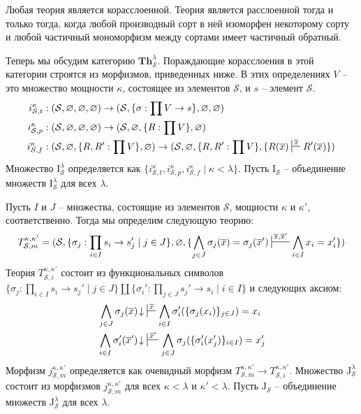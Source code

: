\documentclass[reqno]{amsart}
\theoremstyle{definition}
\theoremstyle{remark}
\newcommand{\bcat}[1]{\mathbf{#1}}
\newcommand{\Th}{\bcat{Th}}
\newcommand{\I}{\mathrm{I}}
\newcommand{\J}{\mathrm{J}}
\begin{document}
\begin{remark}
Любая теория является корасслоенной.
Теория является расслоенной тогда и только тогда, когда любой производный сорт в ней изоморфен некоторому сорту и любой частичный мономорфизм между сортами имеет частичный обратный.
\end{remark}

Теперь мы обсудим категорию $\Th^\lambda_\mathcal{S}$.
Пораждающие корасслоения в этой категории строятся из морфизмов, приведенных ниже.
В этих определениях $V$ -- это множество мощности $\kappa$, состоящее из элементов $\mathcal{S}$, и $s$ -- элемент $\mathcal{S}$.
\begin{align*}
i_{\mathcal{S},t}^\kappa & : (\mathcal{S}, \varnothing, \varnothing, \varnothing) \to (\mathcal{S}, \{ \sigma : \prod V \to s \}, \varnothing, \varnothing) \\
i_{\mathcal{S},p}^\kappa & : (\mathcal{S}, \varnothing, \varnothing, \varnothing) \to (\mathcal{S}, \varnothing, \{ R : \prod V \}, \varnothing) \\
i_{\mathcal{S},f}^\kappa & : (\mathcal{S}, \varnothing, \{ R, R' : \prod V \}, \varnothing) \to (\mathcal{S}, \varnothing, \{ R, R' : \prod V \}, \{ R(\overline{x}) \sststile{}{\overline{x}} R'(\overline{x}) \})
\end{align*}
Множество $\I_\mathcal{S}^\lambda$ определяется как $\{ i_{\mathcal{S},t}^\kappa, i_{\mathcal{S},p}^\kappa, i_{\mathcal{S},f}^\kappa \mid \kappa < \lambda \}$.
Пусть $\I_\mathcal{S}$ -- объединение множеств $\I_\mathcal{S}^\lambda$ для всех $\lambda$.

Пусть $I$ и $J$ -- множества, состоящие из элементов $\mathcal{S}$, мощности $\kappa$ и $\kappa'$, соответственно.
Тогда мы определим следующую теорию:
\[ T_{\mathcal{S},m}^{\kappa,\kappa'} = (\mathcal{S}, \{ \sigma_j : \prod_{i \in I} s_i \to s_j' \mid j \in J \}, \varnothing, \{ \bigwedge_{j \in J} \sigma_j(\overline{x}) = \sigma_j(\overline{x}') \sststile{}{\overline{x},\overline{x}'} \bigwedge_{i \in I} x_i = x_i' \}) \]
Теория $T_{\mathcal{S},i}^{\kappa,\kappa'}$ состоит из функциональных символов $\{ \sigma_j : \prod_{i \in I} s_i \to s_j' \mid j \in J \} \amalg \{ \sigma_i' : \prod_{j \in J} s_j' \to s_i \mid i \in I \}$ и следующих аксиом:
\begin{align*}
& \bigwedge_{j \in J} \sigma_j(\overline{x})\!\downarrow\ \sststile{}{\overline{x}} \bigwedge_{i \in I} \sigma_i'(\{ \sigma_j(x_i) \}_{j \in J}) = x_i \\
& \bigwedge_{i \in I} \sigma_i'(\overline{x}')\!\downarrow\ \sststile{}{\overline{x}'} \bigwedge_{j \in J} \sigma_j(\{ \sigma_i'(x_j') \}_{i \in I}) = x_j'
\end{align*}
Морфизм $j_{\mathcal{S},m}^{\kappa,\kappa'}$ определяется как очевидный морфизм $T_{\mathcal{S},m}^{\kappa,\kappa'} \to T_{\mathcal{S},i}^{\kappa,\kappa'}$.
Множество $\J_\mathcal{S}^\lambda$ состоит из морфизмов $j_{\mathcal{S},m}^{\kappa,\kappa'}$ для всех $\kappa < \lambda$ и $\kappa' < \lambda$.
Пусть $\J_\mathcal{S}$ -- объединение множеств $\J_\mathcal{S}^\lambda$ для всех $\lambda$.
\end{document}
